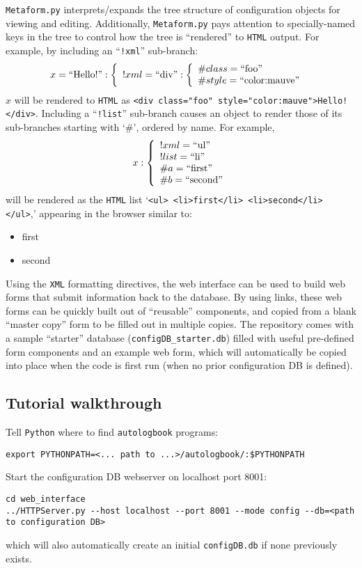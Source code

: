 \documentclass[12pt,english]{article}
\newcommand{\cd}[1]{\texttt{#1}}
\begin{document}
\cd{Metaform.py} interprets/expands the tree structure of configuration objects for viewing and editing.
Additionally, \cd{Metaform.py} pays attention to specially-named keys in the tree to control how the tree is ``rendered'' to \cd{HTML} output.
For example, by including an ``\cd{!xml}'' sub-branch:
\[ x = \textrm{``Hello!''}:  \left\{ \begin{array}{l} !xml = \textrm{``div''}: \left\{ \begin{array}{l} \#class = \textrm{``foo''} \\ \#style = \textrm{``color:mauve''}  \end{array} \right.  \end{array} \right.\]
$x$ will be rendered to \cd{HTML} as \verb#<div class="foo" style="color:mauve">Hello!</div>#.
Including a ``\cd{!list}'' sub-branch causes an object to render those of its sub-branches starting with `\#', ordered by name.
For example,
\[ x: \left\{ \begin{array}{l} !xml = \textrm{``ul''} \\ !list = \textrm{``li''} \\ \#a = \textrm{``first''} \\ \#b = \textrm{``second''}  \end{array} \right.\]
will be rendered as the \cd{HTML} list `\verb#<ul> <li>first</li> <li>second</li> </ul>#,' appearing in the browser similar to:
\begin{itemize}
\item first
\item second
\end{itemize}
Using the \cd{XML} formatting directives, the web interface can be used to build web forms that submit information back to the database.
By using links, these web forms can be quickly built out of ``reusable'' components,
	and copied from a blank ``master copy'' form to be filled out in multiple copies.
The repository comes with a sample ``starter'' database (\cd{configDB\_starter.db})
	filled with useful pre-defined form components and an example web form,
	which will automatically be copied into place when the code is first run (when no prior configuration DB is defined).

%
%
\subsection{Tutorial walkthrough}

Tell \cd{Python} where to find \cd{autologbook} programs:
\begin{verbatim}
export PYTHONPATH=<... path to ...>/autologbook/:$PYTHONPATH
\end{verbatim}
Start the configuration DB webserver on localhost port 8001:
\begin{verbatim}
cd web_interface
../HTTPServer.py --host localhost --port 8001 --mode config --db=<path to configuration DB>
\end{verbatim}
which will also automatically create an initial \cd{configDB.db} if none previously exists.
\end{document}
